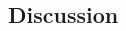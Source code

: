 \documentclass[twoside]{article}
\begin{document}
\begin{multicols}{2}
\section{Discussion}


\begin{thebibliography}{2} %

%
%

\end{thebibliography}


\end{multicols}
\end{document}
